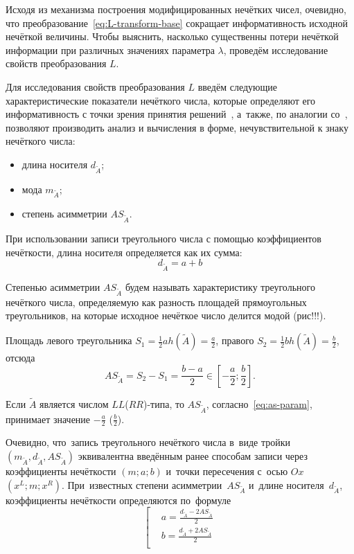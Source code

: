 Исходя из механизма построения модифицированных нечётких чисел, очевидно, что преобразование~\eqref{eq:L-transform-base} сокращает информативность исходной нечёткой величины. Чтобы выяснить, насколько существенны потери нечёткой информации при различных значениях параметра $\lambda$, проведём исследование свойств преобразования $L$.

Для исследования свойств преобразования $L$ введём следующие характеристические показатели нечёткого числа, которые определяют его информативность с точки зрения принятия решений~\cite{Vorontsov_PI, Alushta-1}, а~также, по аналогии со~\cite{Spesivtsev}, позволяют производить анализ и вычисления в форме, нечувствительной к знаку нечёткого числа:
\begin{itemize}
  \item длина носителя $d_{\tilde A}$;
  \item мода $m_{\tilde A}$;
  \item степень асимметрии $AS_{\tilde A}$.
\end{itemize}

При использовании записи треугольного числа с помощью коэффициентов нечёткости, длина носителя определяется как их сумма:
\begin{equation}
\label{eq:support-length}
  d_{\tilde A}=a+b
\end{equation}

\begin{mydef}
  Степенью асимметрии $AS_{\tilde A}$ будем называть характеристику треугольного нечёткого числа, определяемую как разность площадей прямоугольных треугольников, на которые исходное нечёткое число делится модой (рис!!!).
\end{mydef}
Площадь левого треугольника $\displaystyle S_1=\frac{1}{2}ah(\tilde A)=\frac{a}{2}$, правого $\displaystyle S_2=\frac{1}{2}bh\left(\tilde A \right)=\frac{b}{2}$, отсюда
\begin{equation}
\label{eq:as-param}
  AS_{\tilde A}=S_2-S_1=\frac{b-a}{2}\in \left[ -\frac{a}{2};\frac{b}{2} \right].
\end{equation}

Если $\tilde{A}$ является числом $LL$($RR$)-типа, то $AS_{\tilde A}$, согласно~\eqref{eq:as-param}, принимает значение $\displaystyle -\frac{a}{2}$ ($\displaystyle \frac{b}{2}$).

Очевидно, что~запись треугольного нечёткого числа в~виде тройки $\left(m_{\tilde A}, d_{\tilde A}, AS_{\tilde A} \right)$ эквивалентна введённым ранее способам записи через коэффициенты нечёткости $\left( m;a;b \right)$ и~точки пересечения с~осью $Ox$ $\left( x^L;m;x^R \right)$. При~известных степени асимметрии~$AS_{\tilde A}$ и~длине носителя~$d_{\tilde A}$, коэффициенты нечёткости определяются по~формуле
\begin{equation}
\label{eq:mdas-to-abm}
	\left[ \begin{aligned}
      & a=\frac{d_{\tilde A}-2AS_{\tilde A}}{2} \\ 
      & b=\frac{d_{\tilde A}+2AS_{\tilde A}}{2} \\ 
    \end{aligned} \right.
\end{equation}


